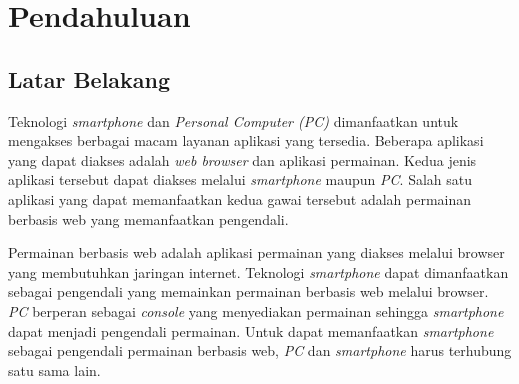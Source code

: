 \chapter{Pendahuluan}
\label{chap:intro}
   
\section{Latar Belakang}
\label{sec:label}



Teknologi \textit{smartphone} dan \textit{Personal Computer (PC)} dimanfaatkan untuk mengakses berbagai macam layanan aplikasi yang tersedia. Beberapa aplikasi yang dapat diakses adalah \textit{web browser} dan aplikasi permainan. Kedua jenis aplikasi tersebut dapat diakses melalui \textit{smartphone} maupun \textit{PC}. Salah satu aplikasi yang dapat memanfaatkan kedua gawai tersebut adalah permainan berbasis web yang memanfaatkan pengendali.

Permainan berbasis web adalah aplikasi permainan yang diakses melalui browser yang membutuhkan jaringan internet. Teknologi \textit{smartphone} dapat dimanfaatkan sebagai pengendali yang memainkan permainan berbasis web melalui browser. \textit{PC} berperan sebagai \textit{console} yang menyediakan permainan sehingga \textit{smartphone} dapat menjadi pengendali permainan. Untuk dapat memanfaatkan \textit{smartphone} sebagai pengendali permainan berbasis web, \textit{PC} dan \textit{smartphone} harus terhubung satu sama lain. 

